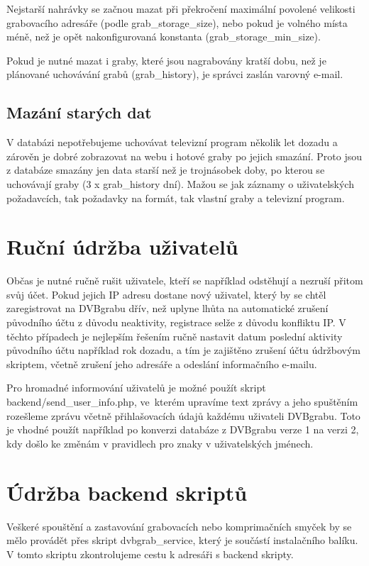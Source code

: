 Nejstarší nahrávky se začnou mazat při překročení maximální povolené velikosti grabovacího adresáře (podle grab\_storage\_size), nebo pokud je volného místa méně, než je opět nakonfigurovaná konstanta (grab\_storage\_min\_size). 

Pokud je nutné mazat i graby, které jsou nagrabovány kratší dobu, než je plánované uchovávání grabů (grab\_history), je správci zaslán varovný e-mail.

\subsection{Mazání starých dat}
V databázi nepotřebujeme uchovávat televizní program několik let dozadu a zárověn je dobré zobrazovat na webu i hotové graby po jejich smazání. Proto jsou z databáze smazány jen data starší než je trojnásobek doby, po kterou se uchovávají graby (3 x grab\_history dní). Mažou se jak záznamy o uživatelských požadavcích, tak požadavky na formát, tak vlastní graby a televizní program.

\section{Ruční údržba uživatelů}
Občas je nutné ručně rušit uživatele, kteří se například odstěhují a nezruší přitom svůj účet. Pokud jejich IP adresu dostane nový uživatel, který by se chtěl zaregistrovat na DVBgrabu dřív, než uplyne lhůta na automatické zrušení původního účtu z důvodu neaktivity, registrace selže z důvodu konfliktu IP. V těchto případech je nejlepším řešením ručně nastavit datum poslední aktivity původního účtu například rok dozadu, a tím je zajištěno zrušení účtu údržbovým skriptem, včetně zrušení jeho adresáře a odeslání informačního e-mailu.

Pro hromadné informování uživatelů je možné použít skript backend/send\_user\_info.php, ve~kterém upravíme text zprávy a jeho spuštěním rozešleme zprávu včetně přihlašovacích údajů každému uživateli DVBgrabu. Toto je vhodné použít například po konverzi databáze z DVBgrabu verze 1 na verzi 2, kdy došlo ke změnám v pravidlech pro znaky v uživatelských jménech.

\section{Údržba backend skriptů}
Veškeré spouštění a zastavování grabovacích nebo komprimačních smyček by se mělo provádět přes skript dvbgrab\_service, který je součástí instalačního balíku. V tomto skriptu zkontrolujeme cestu k adresáři s backend skripty.

